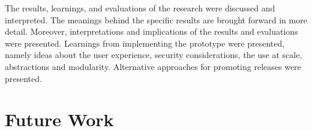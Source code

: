 The results, learnings, and evaluations of the research were discussed and interpreted.
The meanings behind the specific results are brought forward in more detail.
Moreover, interpretations and implications of the results and evaluations were presented.
Learnings from implementing the prototype were presented, namely
ideas about the user experience, security considerations, the use at scale, abstractions and modularity.
Alternative approaches for promoting releases were presented.
%
%
%
%

\section*{Future Work}


